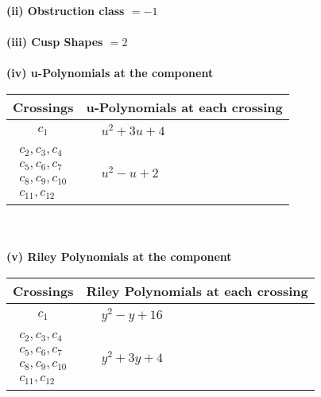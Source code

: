 \documentclass[1p]{elsarticle_modified}
\theoremstyle{definition}
\begin{document}
\flushleft \textbf{(ii) Obstruction class $= -1$}\\~\\
\flushleft \textbf{(iii) Cusp Shapes $= 2$}\\~\\
\newpage\renewcommand{\arraystretch}{1}
\flushleft \textbf{(iv) u-Polynomials at the component}\newline \\
\begin{tabular}{m{50pt}|m{274pt}}
Crossings & \hspace{64pt}u-Polynomials at each crossing \\
\hline $$\begin{aligned}c_{1}\end{aligned}$$&$\begin{aligned}
&u^2+3 u+4
\end{aligned}$\\
\hline $$\begin{aligned}c_{2},c_{3},c_{4}\\c_{5},c_{6},c_{7}\\c_{8},c_{9},c_{10}\\c_{11},c_{12}\end{aligned}$$&$\begin{aligned}
&u^2- u+2
\end{aligned}$\\
\hline
\end{tabular}\\~\\
\newpage\renewcommand{\arraystretch}{1}
\flushleft \textbf{(v) Riley Polynomials at the component}\newline \\
\begin{tabular}{m{50pt}|m{274pt}}
Crossings & \hspace{64pt}Riley Polynomials at each crossing \\
\hline $$\begin{aligned}c_{1}\end{aligned}$$&$\begin{aligned}
&y^2- y+16
\end{aligned}$\\
\hline $$\begin{aligned}c_{2},c_{3},c_{4}\\c_{5},c_{6},c_{7}\\c_{8},c_{9},c_{10}\\c_{11},c_{12}\end{aligned}$$&$\begin{aligned}
&y^2+3 y+4
\end{aligned}$\\
\hline
\end{tabular}\\~\\
\end{document}
